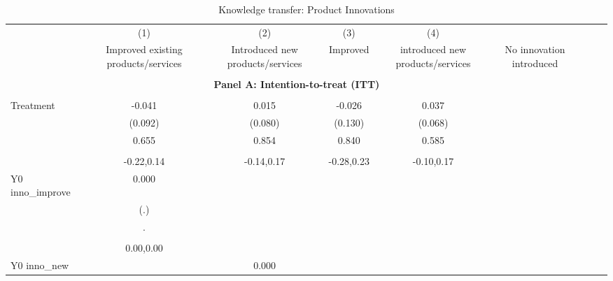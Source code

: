 \begin{table}[!h] \centering \\ \caption{Knowledge transfer: Product Innovations} \\ \begin{adjustbox}{width=\columnwidth,center} \\ \begin{tabular}{l*{8}{c}} \hline\hline
                    &\multicolumn{1}{c}{(1)}         &\multicolumn{1}{c}{(2)}         &\multicolumn{1}{c}{(3)}         &\multicolumn{1}{c}{(4)}         \\
                    &Improved existing products/services         &Introduced new products/services         &Improved & introduced new products/services         &No innovation introduced         \\
\hline \\ \multicolumn{7}{c}{\textbf{Panel A: Intention-to-treat (ITT)}} \\\\[-1ex]
Treatment           &      -0.041         &       0.015         &      -0.026         &       0.037         \\
                    &     (0.092)         &     (0.080)         &     (0.130)         &     (0.068)         \\
                    &       0.655         &       0.854         &       0.840         &       0.585         \\
                    &                     &                     &                     &                     \\
                    &  -0.22,0.14         &  -0.14,0.17         &  -0.28,0.23         &  -0.10,0.17         \\
Y0 inno\_improve     &       0.000         &                     &                     &                     \\
                    &         (.)         &                     &                     &                     \\
                    &           .         &                     &                     &                     \\
                    &                     &                     &                     &                     \\
                    &   0.00,0.00         &                     &                     &                     \\
Y0 inno\_new         &                     &       0.000         &                     &                     \\

\end{tabular}
\end{adjustbox}
\end{table}
